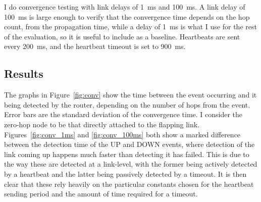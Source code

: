 \documentclass[withindex,glossary,openany]{cam-thesis}
\begin{document}
I do convergence testing with link delays of \SI{1}{\ms} and \SI{100}{\ms}. A link delay of \SI{100}{\ms} is large enough to verify that the convergence time depends on the hop count, from the propagation time, while a delay of \SI{1}{\ms} is what I use for the rest of the evaluation, so it is useful to include as a baseline.  Heartbeats are sent every \SI{200}{\ms}, and the heartbeat timeout is set to \SI{900}{\ms}.

\begin{minipage}{1\textwidth}
\subsection{Results}

The graphs in Figure~\ref{fig:conv} show the time between the event occurring and it being detected by the router, depending on the number of hops from the event. Error bars are the standard deviation of the convergence time. I consider the zero-hop node to be that directly attached to the flapping link. Figures~\ref{fig:conv_1ms} and \ref{fig:conv_100ms} both show a marked difference between the detection time of the UP and DOWN events, where detection of the link coming up happens much faster than detecting it has failed. This is due to the way these are detected at a link-level, with the former being actively detected by a heartbeat and the latter being passively detected by a timeout. It is then clear that these rely heavily on the particular constants chosen for the heartbeat sending period and the amount of time required for a timeout.


\end{minipage}
\end{document}
